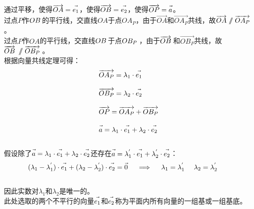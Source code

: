 \documentclass[UTF8]{ctexart}
\let\nvec\vec
\def\vec#1{\nvec{\vphantom b\smash{#1}}}
\renewcommand\parallel{{\hspace{3.0pt}\mathrel{/\mskip-6.5mu/}\hspace{2.6pt}}}
\begin{document}
    通过平移，使得$\overrightarrow{OA}=\vec{e_1}$，使得$\overrightarrow{OB}=\vec{e_2}$，使得$\overrightarrow{OP}=\vec{a}$。\\[3mm]
    过点$P$作$OB\hspace{1.5pt}$的平行线，交直线$OA$于点$OA_P$，由于$\overrightarrow{OA}$和$\overrightarrow{OA_P}$共线，故$\overrightarrow{OA}\parallel\overrightarrow{OA_P}$。\\[3mm]
    过点$P$作$OA$的平行线，交直线$OB\hspace{1.5pt}$于点$OB_P\hspace{2.0pt}$，由于$\overrightarrow{OB}\hspace{2.0pt}$和$\overrightarrow{OB_P}$共线，故$\overrightarrow{OB}\hspace{2.0pt}\parallel\overrightarrow{OB_P}\hspace{2.0pt}$。\\[3mm]
    根据向量共线定理可得：
    \begin{align}
        &\overrightarrow{OA_P}=\lambda_1\cdot\vec{e_1}\\[3mm]
        &\overrightarrow{OB_P}=\lambda_2\cdot\vec{e_2}\\[3mm]
        &\overrightarrow{OP}=\overrightarrow{OA_P}+\overrightarrow{OB_P}\\[3mm]
        &\vec{a}=\lambda_1\cdot\vec{e_1}+\lambda_2\cdot\vec{e_2}
    \end{align}\\
    假设除了$\vec{a}=\lambda_1\cdot\vec{e_1}+\lambda_2\cdot\vec{e_2}$还存在$\vec{a}=\lambda_1^{'}\cdot\vec{e_1}+\lambda_2^{'}\cdot\vec{e_2}$：
    \begin{align}
        &(\lambda_1-\lambda_1^{'})\cdot\vec{e_1}+(\lambda_2-\lambda_2^{'})\cdot\vec{e_2}=\vec{0}~~~~\Longrightarrow~~~~\lambda_1=\lambda_1^{'}~~~~\lambda_2=\lambda_2^{'}~~
    \end{align}\\
    因此实数对$\lambda_1$和$\lambda_2$是唯一的。\\[3mm]
    此处选取的两个不平行的向量$\vec{e_1}$和$\vec{e_2}$称为平面内所有向量的一组基或一组基底。

\newpage
\end{document}
